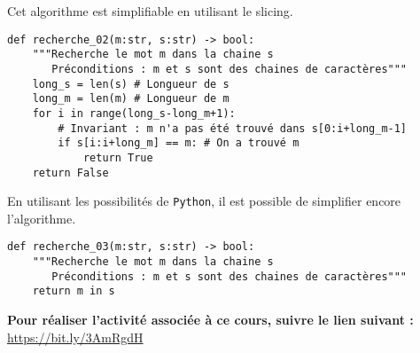 Cet algorithme est simplifiable en utilisant le slicing.
\begin{lstlisting}
def recherche_02(m:str, s:str) -> bool:
    """Recherche le mot m dans la chaine s
       Préconditions : m et s sont des chaines de caractères"""
    long_s = len(s) # Longueur de s
    long_m = len(m) # Longueur de m
    for i in range(long_s-long_m+1): 
        # Invariant : m n'a pas été trouvé dans s[0:i+long_m-1]
        if s[i:i+long_m] == m: # On a trouvé m
            return True
    return False
\end{lstlisting}

En utilisant les possibilités de \texttt{Python}, il est possible de simplifier encore l'algorithme. 

\begin{lstlisting}
def recherche_03(m:str, s:str) -> bool:
    """Recherche le mot m dans la chaine s
       Préconditions : m et s sont des chaines de caractères"""
    return m in s
\end{lstlisting}




\textbf{Pour réaliser l'activité associée à ce cours, suivre le lien suivant : }
\url{https://bit.ly/3AmRgdH}